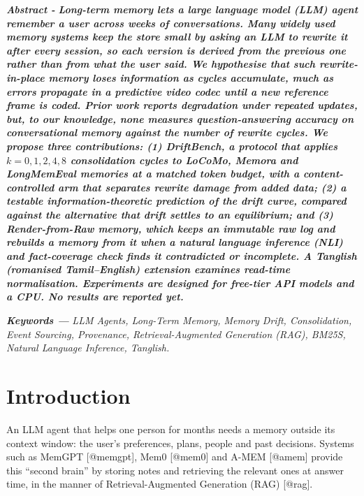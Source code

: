 

\begin{abstractbox}
\textbf{\textit{Abstract -}} \textbf{\textit{Long-term memory lets a large language model (LLM) agent remember a user across weeks of conversations. Many widely used memory systems keep the store small by asking an LLM to rewrite it after every session, so each version is derived from the previous one rather than from what the user said. We hypothesise that such rewrite-in-place memory loses information as cycles accumulate, much as errors propagate in a predictive video codec until a new reference frame is coded. Prior work reports degradation under repeated updates, but, to our knowledge, none measures question-answering accuracy on conversational memory against the number of rewrite cycles. We propose three contributions: (1) DriftBench, a protocol that applies $k = 0, 1, 2, 4, 8$ consolidation cycles to LoCoMo, Memora and LongMemEval memories at a matched token budget, with a content-controlled arm that separates rewrite damage from added data; (2) a testable information-theoretic prediction of the drift curve, compared against the alternative that drift settles to an equilibrium; and (3) Render-from-Raw memory, which keeps an immutable raw log and rebuilds a memory from it when a natural language inference (NLI) and fact-coverage check finds it contradicted or incomplete. A Tanglish (romanised Tamil--English) extension examines read-time normalisation. Experiments are designed for free-tier API models and a CPU. No results are reported yet.}}

\textbf{\textit{Keywords ---}} \textit{LLM Agents, Long-Term Memory, Memory Drift, Consolidation, Event Sourcing, Provenance, Retrieval-Augmented Generation (RAG), BM25S, Natural Language Inference, Tanglish.}
\end{abstractbox}

\section{Introduction}

An LLM agent that helps one person for months needs a memory outside its context window: the user's preferences, plans, people and past decisions. Systems such as MemGPT [@memgpt], Mem0 [@mem0] and A-MEM [@amem] provide this ``second brain'' by storing notes and retrieving the relevant ones at answer time, in the manner of Retrieval-Augmented Generation (RAG) [@rag].

